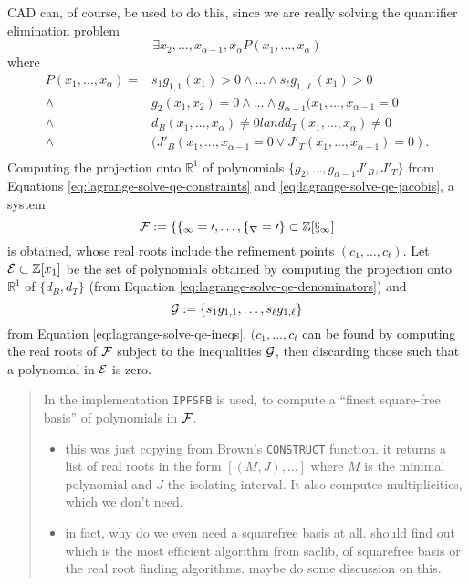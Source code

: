 \documentclass[
]{book}
\providecommand{\tightlist}{%
  \setlength{\itemsep}{0pt}\setlength{\parskip}{0pt}}
\theoremstyle{definition}
\theoremstyle{definition}
\theoremstyle{definition}
\theoremstyle{definition}
\theoremstyle{remark}
\begin{document}
CAD can, of course, be used to do this, since we are really solving the quantifier elimination problem
\[
\exists x_2,\ldots,x_{\alpha - 1},x_\alpha P(x_1,\ldots,x_\alpha)
\] where
\begin{align}
P(x_1,\ldots,x_\alpha) = & s_1 g_{1,1}(x_1) > 0 \land \ldots \land s_\ell g_{1,\ell}(x_1) > 0
\label{eq:lagrange-solve-qe-ineqs} \\
\land & g_2(x_1,x_2) = 0 \land \ldots \land g_{\alpha - 1}(x_1,\ldots,x_{\alpha - 1} = 0
\label{eq:lagrange-solve-qe-constraints} \\
\land & d_B(x_1,\ldots,x_\alpha) \ne 0 land d_T(x_1,\ldots,x_\alpha) \ne 0
\label{eq:lagrange-solve-qe-denominators} \\
\land & ( J'_B(x_1,\ldots,x_{\alpha - 1} = 0 \lor J'_T(x_1,\ldots,x_{\alpha - 1}) = 0 ).
\label{eq:lagrange-solve-qe-jacobis} \\
\end{align}
Computing the projection onto \(\mathbb{R}^1\) of polynomials \(\{g_2,\ldots,g_{\alpha - 1} J'_B, J'_T \}\) from Equations \eqref{eq:lagrange-solve-qe-constraints} and \eqref{eq:lagrange-solve-qe-jacobis}, a system
\[
\cal{F} := \{ f_1=0 ,\ldots,f_r=0 \} \subset \mathbb{Z}[x_1]
\]
is obtained, whose real roots include the refinement points \((c_1,\ldots,c_t)\).
Let \({\cal E} \subset \mathbb{Z}[x_1]\) be the set of polynomials obtained by computing the projection onto \(\mathbb{R}^1\) of \(\{ d_B, d_T \}\) (from Equation \eqref{eq:lagrange-solve-qe-denominators}) and
\[{\cal G} := \{ s_1 g_{1,1}, \ldots, s_\ell g_{1,\ell} \}
\]
from Equation \eqref{eq:lagrange-solve-qe-ineqs}.
\((c_1,\ldots,c_t\) can be found by computing the real roots of \(\cal F\) subject to the inequalities \(\cal G\), then discarding those such that a polynomial in \(\cal E\) is zero.

\begin{quote}
In the implementation \texttt{IPFSFB} is used, to compute a ``finest square-free basis'' of polynomials in \(\cal F\).

\begin{itemize}
\tightlist
\item
  this was just copying from Brown's \texttt{CONSTRUCT} function. it returns a list of real roots in the form \([(M,J),...]\) where \(M\) is the minimal polynomial and \(J\) the isolating interval. It also computes multiplicities, which we don't need.
\item
  in fact, why do we even need a squarefree basis at all. should find out which is the most efficient algorithm from saclib, of squarefree basis or the real root finding algorithms. maybe do some discussion on this.
\end{itemize}
\end{quote}
\end{document}
